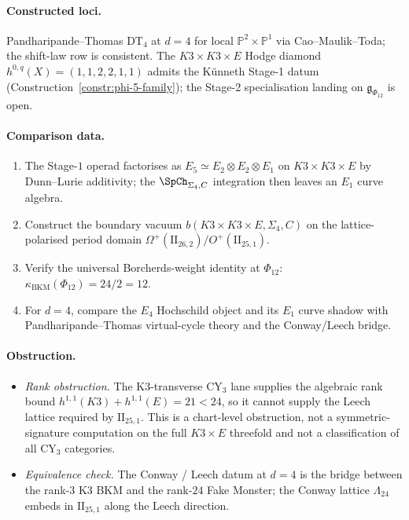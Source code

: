 \paragraph{Constructed loci.} Pandharipande--Thomas DT$_4$ at $d = 4$ for
local $\mathbb{P}^2 \times \mathbb{P}^1$ via Cao--Maulik--Toda; the
shift-law row is consistent. The $K3 \times K3 \times E$ Hodge diamond
$h^{0, q}(X) = (1, 1, 2, 2, 1, 1)$ admits the K\"unneth Stage-1 datum
(Construction~\ref{constr:phi-5-family}); the Stage-2 specialisation
landing on $\mathfrak{g}_{\Phi_{12}}$ is open.

\paragraph{Comparison data.}
\begin{enumerate}[nosep]
\item The Stage-$1$ operad factorises as
  $E_5 \simeq E_2 \otimes E_2 \otimes E_1$ on
  $K3 \times K3 \times E$ by Dunn--Lurie additivity; the
  $\SpCh_{\Sigma_4,C}$ integration then leaves an $E_1$ curve algebra.
\item Construct the boundary vacuum $b(K3 \times K3 \times E, \Sigma_4, C)$
  on the lattice-polarised period domain
  $\Omega^+(\mathrm{II}_{26, 2}) / O^+(\mathrm{II}_{25, 1})$.
\item Verify the universal Borcherds-weight identity at $\Phi_{12}$:
  $\kappa_{\mathrm{BKM}}(\Phi_{12}) = 24/2 = 12$.
\item For $d = 4$, compare the $E_4$ Hochschild object and its
  $E_1$ curve shadow with Pandharipande--Thomas virtual-cycle theory
  and the Conway/Leech bridge.
\end{enumerate}

\paragraph{Obstruction.}
\begin{itemize}[nosep]
\item \emph{Rank obstruction.} The K3-transverse CY$_3$ lane supplies
  the algebraic rank bound \(h^{1,1}(K3)+h^{1,1}(E)=21<24\), so it
  cannot supply the Leech lattice required by
  \(\mathrm{II}_{25,1}\). This is a chart-level obstruction, not a
  symmetric-signature computation on the full \(K3\times E\) threefold
  and not a classification of all CY$_3$ categories.
\item \emph{Equivalence check.} The Conway / Leech datum at $d = 4$ is
  the bridge between the rank-$3$ K3 BKM and the rank-$24$ Fake
  Monster; the Conway lattice $\Lambda_{24}$ embeds in
  $\mathrm{II}_{25, 1}$ along the Leech direction.
\end{itemize}

